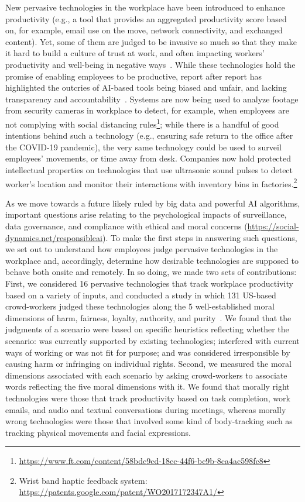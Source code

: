 New pervasive technologies in the workplace have been introduced to enhance productivity (e.g., a tool that provides an aggregated productivity score based on, for example, email use on the move, network connectivity, and exchanged content). Yet, some of them are judged to be invasive so much so that they make it hard to build a culture of trust at work, and often impacting workers' productivity and well-being in negative ways~\cite{alge2013workplace}. While these technologies hold the promise of enabling employees to be productive, report after report has highlighted the outcries of AI-based tools being biased and unfair, and lacking transparency and accountability~\cite{buolamwini2018gender}. Systems are now being used to analyze footage from security cameras in workplace to detect, for example, when employees are not complying with social distancing rules\footnote{\url{https://www.ft.com/content/58bdc9cd-18cc-44f6-bc9b-8ca4ac598fc8}}; while there is a handful of good intentions behind such a technology (e.g., ensuring safe return to the office after the COVID-19 pandemic), the very same technology could be used to surveil employees' movements, or time away from desk. Companies now hold protected intellectual properties on technologies that use ultrasonic sound pulses to detect worker's location and monitor their interactions with inventory bins in factories.\footnote{Wrist band haptic feedback system: \url{https://patents.google.com/patent/WO2017172347A1/}}

As we move towards a future likely ruled by big data and powerful AI algorithms, important questions arise relating to the psychological impacts of surveillance, data governance, and compliance with ethical and moral concerns (\url{https://social-dynamics.net/responsibleai}). To make the first steps in answering such questions, we set out to understand how employees judge pervasive technologies in the workplace and, accordingly, determine how desirable technologies are supposed to behave both onsite and remotely. In so doing, we made two sets of contributions: First, we considered 16 pervasive technologies that track workplace productivity based on a variety of inputs, and conducted a study in which 131 US-based crowd-workers judged these technologies along the 5 well-established moral dimensions of harm, fairness, loyalty, authority, and purity~\cite{haidt2007new}. We found that the judgments of a scenario were based on specific heuristics reflecting whether the scenario: was currently supported by existing technologies; interfered with current ways of working or was not fit for purpose; and was considered irresponsible by causing harm or infringing on individual rights. Second, we measured the moral dimensions associated with each scenario by asking crowd-workers to associate words reflecting the five moral dimensions with it. We found that morally right technologies were those that track productivity based on task completion, work emails, and audio and textual conversations during meetings, whereas morally wrong technologies were those that involved some kind of body-tracking such as tracking physical movements and facial expressions.
